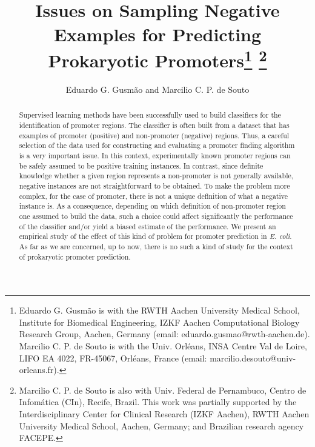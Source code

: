 \documentclass[conference]{IEEEtran}
\begin{document}
\title{\ \\ \LARGE\bf Issues on Sampling Negative Examples for Predicting Prokaryotic Promoters\thanks{
Eduardo G. Gusm\~{a}o is with the RWTH Aachen University Medical School, Institute for Biomedical Engineering, IZKF Aachen Computational Biology Research Group, Aachen, Germany (email: eduardo.gusmao@rwth-aachen.de).
Marcilio C. P. de Souto is with the Univ. Orl\'{e}ans, INSA Centre Val de Loire, LIFO EA 4022, FR-45067, Orl\'{e}ans, France (email: marcilio.desouto@univ-orleans.fr).
}
\thanks{Marcilio C. P. de Souto is also with Univ. Federal de Pernambuco, Centro de Infom\'{a}tica (CIn), Recife, Brazil. This work was partially supported by the Interdisciplinary Center for Clinical Research (IZKF Aachen), RWTH Aachen University Medical School, Aachen, Germany; and Brazilian research agency FACEPE.}
}

\author{Eduardo G. Gusm\~{a}o and Marcilio C. P. de Souto}


\maketitle

\begin{abstract}
Supervised learning methods have been successfully used to build classifiers for the identification of promoter regions. The classifier is often built from a dataset that has examples of promoter (positive) and non-promoter (negative) regions. Thus, a careful selection of the data used for constructing and evaluating a promoter finding algorithm is a very important issue. In this context, experimentally known promoter regions can be safely assumed to be positive training instances. In contrast, since definite knowledge whether a given region represents a non-promoter is not generally available, negative instances are not straightforward to be obtained. To make the problem more complex, for the case of promoter, there is not a unique definition of what a negative instance is. As a consequence, depending on which definition of non-promoter region one assumed to build the data, such a choice could affect significantly the performance of the classifier and/or yield a biased estimate of the performance. We present an empirical study of the effect of this kind of problem for promoter prediction in {\it E. coli}. As far as we are concerned, up to now, there is no such a kind of study for the context of prokaryotic promoter prediction.
\end{abstract}
\end{document}
